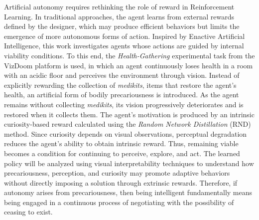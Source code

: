 Artificial autonomy requires rethinking the role of reward in Reinforcement Learning. In traditional approaches, the agent learns from external rewards defined by the designer, which may produce efficient behaviors but limits the emergence of more autonomous forms of action. Inspired by Enactive Artificial Intelligence, this work investigates agents whose actions are guided by internal viability conditions. To this end, the \textit{Health-Gathering} experimental task from the VizDoom platform is used, in which an agent continuously loses health in a room with an acidic floor and perceives the environment through vision. Instead of explicitly rewarding the collection of \textit{medikits}, items that restore the agent's health, an artificial form of bodily precariousness is introduced. As the agent remains without collecting \textit{medikits}, its vision progressively deteriorates and is restored when it collects them. The agent's motivation is produced by an intrinsic curiosity-based reward calculated using the \textit{Random Network Distillation} (RND) method. Since curiosity depends on visual observations, perceptual degradation reduces the agent's ability to obtain intrinsic reward. Thus, remaining viable becomes a condition for continuing to perceive, explore, and act. The learned policy will be analyzed using visual interpretability techniques to understand how precariousness, perception, and curiosity may promote adaptive behaviors without directly imposing a solution through extrinsic rewards. Therefore, if autonomy arises from precariousness, then being intelligent fundamentally means being engaged in a continuous process of negotiating with the possibility of ceasing to exist.


